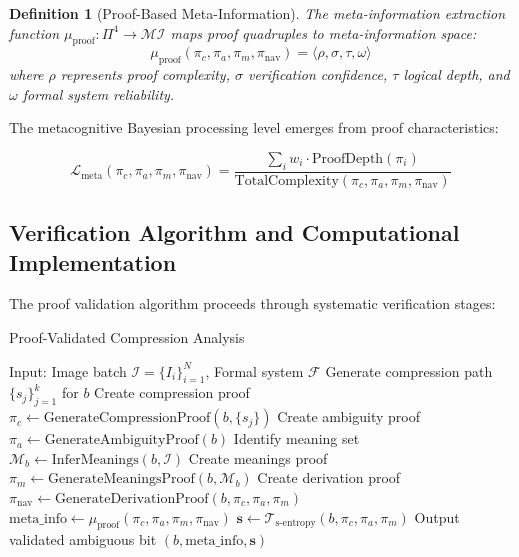 \documentclass[11pt,a4paper]{article}
\newtheorem{definition}[theorem]{Definition}
\begin{document}
\begin{definition}[Proof-Based Meta-Information]
The meta-information extraction function $\mu_{\text{proof}}: \Pi^4 \to \mathcal{MI}$ maps proof quadruples to meta-information space:
\begin{equation}
\mu_{\text{proof}}(\pi_c, \pi_a, \pi_m, \pi_{\text{nav}}) = \langle \rho, \sigma, \tau, \omega \rangle
\label{eq:proof-meta-info}
\end{equation}
where $\rho$ represents proof complexity, $\sigma$ verification confidence, $\tau$ logical depth, and $\omega$ formal system reliability.
\end{definition}

The metacognitive Bayesian processing level emerges from proof characteristics:

\begin{equation}
\mathcal{L}_{\text{meta}}(\pi_c, \pi_a, \pi_m, \pi_{\text{nav}}) = \frac{\sum_{i} w_i \cdot \text{ProofDepth}(\pi_i)}{\text{TotalComplexity}(\pi_c, \pi_a, \pi_m, \pi_{\text{nav}})}
\label{eq:metacognitive-level}
\end{equation}

\subsection{Verification Algorithm and Computational Implementation}

The proof validation algorithm proceeds through systematic verification stages:

\begin{algorithm}[H]
\caption{Proof-Validated Compression Analysis}
\begin{algorithmic}[1]
\STATE Input: Image batch $\mathcal{I} = \{I_i\}_{i=1}^N$, Formal system $\mathcal{F}$
    \STATE Generate compression path $\{s_j\}_{j=1}^k$ for $b$
    \STATE Create compression proof $\pi_c \leftarrow \text{GenerateCompressionProof}(b, \{s_j\})$
    \STATE Create ambiguity proof $\pi_a \leftarrow \text{GenerateAmbiguityProof}(b)$
    \STATE Identify meaning set $\mathcal{M}_b \leftarrow \text{InferMeanings}(b, \mathcal{I})$
    \STATE Create meanings proof $\pi_m \leftarrow \text{GenerateMeaningsProof}(b, \mathcal{M}_b)$
    \STATE Create derivation proof $\pi_{\text{nav}} \leftarrow \text{GenerateDerivationProof}(b, \pi_c, \pi_a, \pi_m)$
        \STATE $\text{meta\_info} \leftarrow \mu_{\text{proof}}(\pi_c, \pi_a, \pi_m, \pi_{\text{nav}})$
        \STATE $\mathbf{s} \leftarrow \mathcal{T}_{\text{s-entropy}}(b, \pi_c, \pi_a, \pi_m)$
        \STATE Output validated ambiguous bit $(b, \text{meta\_info}, \mathbf{s})$
    \ENDIF
\ENDFOR
\end{algorithmic}
\end{algorithm}
\end{document}
